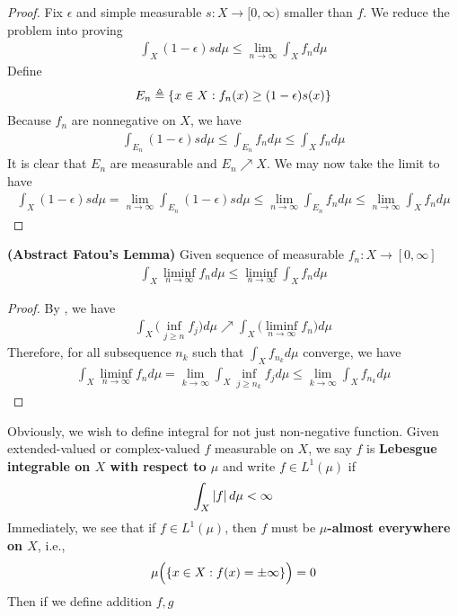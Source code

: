 \documentclass{report}
\begin{document}
\begin{proof}
Fix $\epsilon $ and simple measurable $s:X\rightarrow [0,\infty)$ smaller than $f$. We reduce the problem into proving 
\begin{align*}
  \int_X (1-\epsilon )sd\mu \leq  \lim_{n\to \infty}\int_X f_nd\mu
\end{align*}
Define 
\begin{align*}
E_n \triangleq \{ x\in X: f_n(x)\geq (1-\epsilon )s(x) \}
\end{align*}
Because $f_n$ are nonnegative on  $X$, we have
\begin{align*}
\int _{E_n}(1-\epsilon )sd\mu \leq \int_{E_n}f_nd\mu \leq \int_X f_nd\mu 
\end{align*}
It is clear that $E_n$ are measurable and $E_n \nearrow X$. We may now take the limit to have
\begin{align*}
  \int_X (1-\epsilon )sd\mu = \lim_{n\to \infty}\int_{E_n}(1-\epsilon )sd\mu \leq \lim_{n\to \infty}\int_{E_n}f_nd\mu \leq \lim_{n\to \infty}\int_X f_n d\mu
\end{align*}
\end{proof}
\begin{theorem}
\label{Fatoun}
\textbf{(Abstract Fatou's Lemma)} Given sequence of measurable $f_n:X\rightarrow [0,\infty]$ 
\begin{align*}
\int_X \liminf_{n\to\infty} f_nd\mu \leq \liminf_{n\to\infty} \int_X f_n d\mu
\end{align*}
\end{theorem}
\begin{proof}
By , we have
\begin{align*}
\int_X \big(\inf_{j\geq n} f_j \big)d\mu \nearrow \int_X \big(\liminf_{n\to\infty} f_n \big) d\mu
\end{align*}
Therefore, for all subsequence $n_k$ such that $\int_X f_{n_k}d\mu$ converge, we have 
\begin{align*}
\int_X \liminf_{n\to\infty} f_n d\mu = \lim_{k\to \infty}\int_X \inf_{j\geq n_k}f_jd\mu \leq \lim_{k\to \infty}\int_X f_{n_k}d\mu 
\end{align*}
\end{proof}
\begin{mdframed}
Obviously, we wish to define integral for not just non-negative function. Given extended-valued or complex-valued $f$ measurable on $X$, we say $f$ is \textbf{Lebesgue integrable on $X$ with respect to $\mu$} and write $f\in L^1(\mu)$ if 
\begin{align*}
\int_X \left|f\right|d\mu <\infty
\end{align*}
Immediately, we see that if $f\in L^1(\mu)$, then $f$ must be  \textbf{$\mu$-almost everywhere on $X$}, i.e., 
\begin{align*}
\mu \Big(\{ x \in X: f(x)=\pm \infty \} \Big)=0
\end{align*}
Then if we define addition $f,g$ 




\end{mdframed}
\end{document}
